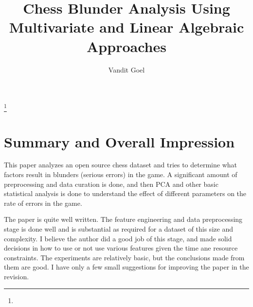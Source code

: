 \documentclass{amsart}
\theoremstyle{definition}
\theoremstyle{remark}
\numberwithin{equation}{section}
\begin{document}
    \title{Chess Blunder Analysis Using Multivariate and Linear Algebraic Approaches}

    \author{Vandit Goel}
    \address{University of Texas at Arlington, 701 S. Nedderman Dr., Arlington, TX 76019}
    \curraddr{}
    \thanks{}

    \maketitle

    \section{Summary and Overall Impression}
        This paper analyzes an open source chess dataset and tries to determine what factors result in blunders (serious errors) in the game. A significant amount of preprocessing and data curation is done, and then PCA and other basic statistical analysis is done to understand the effect of different parameters on the rate of errors in the game.
        
        The paper is quite well written. The feature engineering and data preprocessing stage is done well and is substantial as required for a dataset of this size and complexity. I believe the author did a good job of this stage, and made solid decisions in how to use or not use various features given the time ane resource constraints. The experiments are relatively basic, but the conclusions made from them are good. I have only a few small suggestions for improving the paper in the revision.
\end{document}
